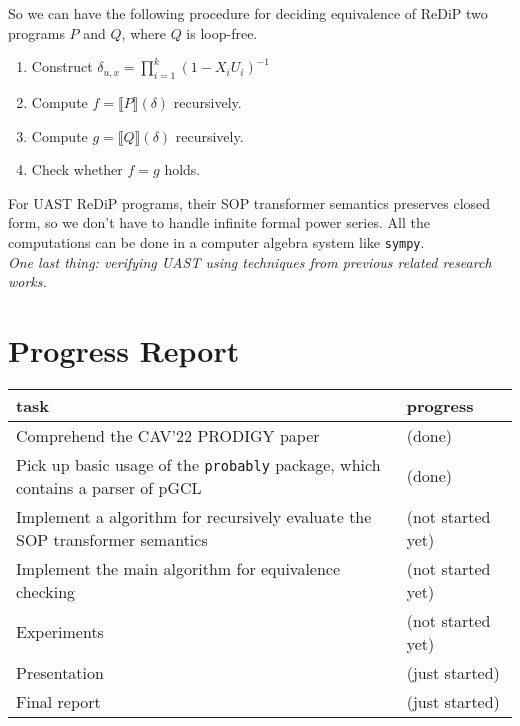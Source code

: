 \documentclass[a4paper]{article}
\renewcommand{\S}[1]{ \llbracket #1 \rrbracket }
\begin{document}
So we can have the following procedure for deciding equivalence of ReDiP two programs \(P\) and \(Q\), where \(Q\) is loop-free.

\begin{enumerate}
	\item Construct \(\delta_{u,x}=\prod_{i=1}^k {(1-X_i U_i)}^{-1}\)
	\item Compute \(f=\S{P}(\delta)\) recursively.
	\item Compute \(g=\S{Q}(\delta)\) recursively.
	\item Check whether \(f=g\) holds.
\end{enumerate}

For UAST ReDiP programs, their SOP transformer semantics preserves closed form, so we don't have to handle infinite formal power series.
All the computations can be done in a computer algebra system like \texttt{sympy}.\\

\emph{One last thing: verifying UAST using techniques from previous related research works.}

\appendix
\section{Progress Report}

\begin{center}
	\begin{tabular}{ll}
		\hline
		task                                                                                  & progress          \\
		\hline
		Comprehend the CAV'22 PRODIGY paper                                                   & (done)            \\
		Pick up basic usage of the \texttt{probably} package, which contains a parser of pGCL & (done)            \\
		Implement a algorithm for recursively evaluate the SOP transformer semantics          & (not started yet) \\
		Implement the main algorithm for equivalence checking                                 & (not started yet) \\
		Experiments                                                                           & (not started yet) \\
		Presentation                                                                          & (just started)    \\
		Final report                                                                          & (just started)    \\
		\hline
	\end{tabular}
\end{center}

\end{document}
